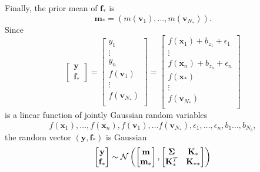 Finally, the prior mean of $\mathbf{f}_*$ is
\begin{equation*}
    \mathbf{m}_* = (m(\mathbf{v}_1), \dots, m(\mathbf{v}_{N_*})).
\end{equation*}
Since
\begin{equation*}
    \begin{bmatrix}
        \mathbf{y} \\
        \mathbf{f}_{*}
    \end{bmatrix}
    =
    \begin{bmatrix}
        y_1 \\
        \vdots \\
        y_n \\
        f(\mathbf{v}_1) \\
        \vdots \\
        f(\mathbf{v}_{N_{*}}) \\
    \end{bmatrix}
    =
    \begin{bmatrix}
        f(\mathbf{x}_1) + b_{z_1} + \epsilon_1 \\
        \vdots \\
        f(\mathbf{x}_n) + b_{z_n} + \epsilon_n \\
        f(\mathbf{x}_*) \\
        \vdots \\
        f(\mathbf{v}_{N_{*}}) \\
    \end{bmatrix}
\end{equation*}
is a linear function of jointly Gaussian random variables
\begin{equation*}
    f(\mathbf{x}_1), \dots, f(\mathbf{x}_n), f(\mathbf{v}_1), \dots f(\mathbf{v}_{N_*}), \epsilon_1, \dots, \epsilon_n, b_1 \dots, b_{N_b},
\end{equation*}
the random vector $(\mathbf{y}, \mathbf{f}_*)$ is Gaussian
\begin{equation*}
    \begin{bmatrix}
        \mathbf{y} \\
        \mathbf{f}_*
    \end{bmatrix}
    \sim
    \mathcal{N}\left(
    \begin{bmatrix}
            \mathbf{m} \\
            \mathbf{m}_*
        \end{bmatrix}
    ,
    \begin{bmatrix}
            \boldsymbol{\Sigma} & \mathbf{K}_* \\
            \mathbf{K}_*^T & \mathbf{K}_{* *}
        \end{bmatrix}
    \right)
\end{equation*}
